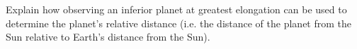 \documentclass[main.tex]{subfiles}
\begin{document}
\begin{q}{1}
Explain how observing an inferior planet at greatest elongation can be used to determine the planet's relative distance (i.e. the distance of the planet from the Sun relative to Earth's distance from the Sun).
\end{q}

\begin{sol}

\end{sol}
\end{document}
